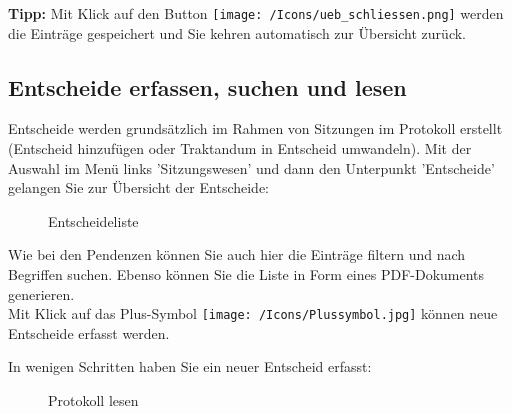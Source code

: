 \textbf{Tipp:} Mit Klick auf den Button \texttt{[image: /Icons/ueb\_schliessen.png]} werden die Einträge gespeichert und Sie kehren automatisch zur Übersicht zurück.

\subsection{Entscheide erfassen, suchen und lesen}

Entscheide werden grundsätzlich im Rahmen von Sitzungen im Protokoll erstellt (Entscheid hinzufügen oder Traktandum in Entscheid umwandeln). 
Mit der Auswahl im Menü links 'Sitzungswesen' und dann den Unterpunkt 'Entscheide' gelangen Sie zur Übersicht der Entscheide:

\begin{figure}[H]
\caption{Entscheideliste}
\end{figure}

Wie bei den Pendenzen können Sie auch hier die Einträge filtern und nach Begriffen suchen. Ebenso können Sie die Liste in Form eines PDF-Dokuments generieren. \\

Mit Klick auf das Plus-Symbol \texttt{[image: /Icons/Plussymbol.jpg]} können neue Entscheide erfasst werden.

\clearpage
In wenigen Schritten haben Sie ein neuer Entscheid erfasst:

\begin{figure}[H]
\caption{Protokoll lesen}
\end{figure}

